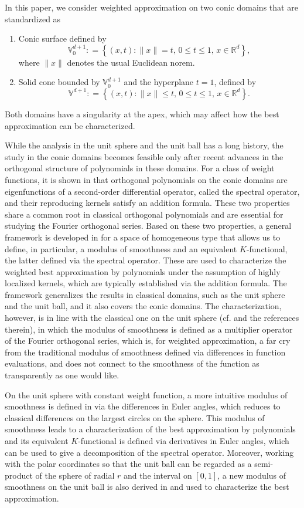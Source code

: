 \documentclass{amsart}
\theoremstyle{remark}
\def\RR{{\mathbb R}}
\def\VV{{\mathbb V}}
\def\RR{{\mathbb R}}
\def\VV{{\mathbb V}}
\begin{document}
In this paper, we consider weighted approximation on two conic domains that are standardized as 
\begin{enumerate}[\quad (1)]
\item Conic surface defined by 
$$
	\VV_0^{d+1}: = \left\{(x,t) : \|x\| = t, \, 0 \le t \le 1, \, x\in \RR^d\right\},
$$ 
where $\|x\|$ denotes the usual Euclidean norem. 
\item Solid cone bounded by $\VV_0^{d+1}$ and the hyperplane $t =1$, defined by 
$$
	\VV^{d+1}: = \left\{(x,t): \|x\| \leq  t, \, 0 \le t \le 1, \, x\in \RR^d\right\}.
$$
\end{enumerate}
Both domains have a singularity at the apex, which may affect how the best approximation can be characterized.

While the analysis in the unit sphere and the unit ball has a long history, the study in the conic domains becomes 
feasible only after recent advances in the orthogonal structure of polynomials in these domains. For a class of 
weight functions, it is shown in \cite{X20} that orthogonal polynomials on the conic domains are eigenfunctions of 
a second-order differential operator, called the spectral operator, and their reproducing kernels satisfy an addition formula. 
These two properties share a common root in classical orthogonal polynomials \cite{DX} and are essential for studying 
the Fourier orthogonal series. Based on these two properties, a general framework is developed in \cite{X21} for 
a space of homogeneous type that allows us to define, in particular, a modulus of smoothness and an equivalent 
$K$-functional, the latter defined via the spectral operator. These are used to characterize the weighted best 
approximation by polynomials under the assumption of highly localized kernels, which are typically established via 
the addition formula. The framework generalizes the results in classical domains, such as the unit sphere and 
the unit ball, and it also covers the conic domains. The characterization, however, is in line with the classical one 
on the unit sphere (cf. \cite{BBP, LN, P, Rus, X05} and the references therein), in which the modulus of smoothness 
is defined as a multiplier operator of the Fourier orthogonal series, which is, for weighted approximation, 
a far cry from the traditional modulus of smoothness defined via differences in function evaluations, and does 
not connect to the smoothness of the function as transparently as one would like. 

On the unit sphere with constant weight function, a more intuitive modulus of smoothness is defined in \cite{DaiX2} 
via the differences in Euler angles, which reduces to classical differences on the largest circles on the sphere. This 
modulus of smoothness leads to a characterization of the best approximation by polynomials and its equivalent 
$K$-functional is defined via derivatives in Euler angles, which can be used to give a decomposition of the spectral 
operator. Moreover, working with the polar coordinates so that the unit ball can be regarded as a semi-product of 
the sphere of radial $r$ and the interval on $[0,1]$, a new modulus of smoothness on the unit ball is also derived 
in \cite{DaiX2} and used to characterize the best approximation. 
\end{document}
